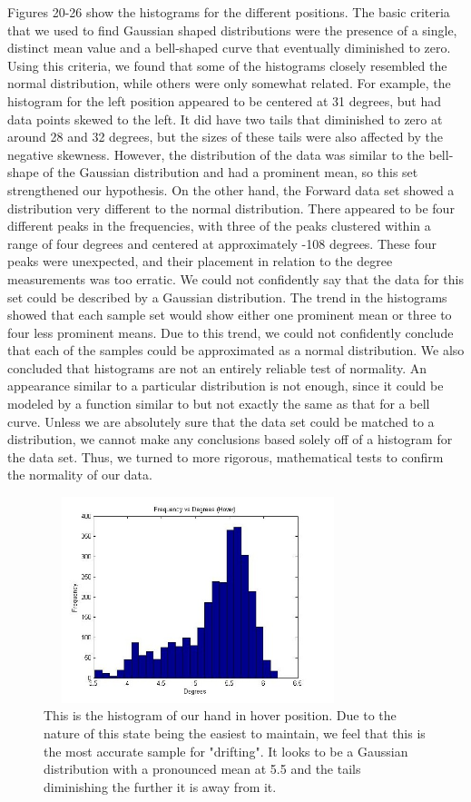\documentclass[letterpaper,english, 12pt]{article}
\begin{document}
Figures 20-26 show the histograms for the different positions. The basic criteria that we used to find Gaussian shaped distributions were the presence of a single, distinct mean value and a bell-shaped curve that eventually diminished to zero. Using this criteria, we found that some of the histograms closely resembled the normal distribution, while others were only somewhat related. For example, the histogram for the left position appeared to be centered at 31 degrees, but had data points skewed to the left. It did have two tails that diminished to zero at around 28 and 32 degrees, but the sizes of these tails were also affected by the negative skewness.  However, the distribution of the data was similar to the bell-shape of the Gaussian distribution and had a prominent mean, so this set strengthened our hypothesis. On the other hand, the Forward data set showed a distribution very different to the normal distribution. There appeared to be four different peaks in the frequencies, with three of the peaks clustered within a range of four degrees and centered at approximately -108 degrees. These four peaks were unexpected, and their placement in relation to the degree measurements was too erratic. We could not confidently say that the data for this set could be described by a Gaussian distribution. The trend in the histograms showed that each sample set would show either one prominent mean or three to four less prominent means. Due to this trend, we could not confidently conclude that each of the samples could be approximated as a normal distribution. We also concluded that histograms are not an entirely reliable test of normality. An appearance similar to a particular distribution is not enough, since it could be modeled by a function similar to but not exactly the same as that for a bell curve. Unless we are absolutely sure that the data set could be matched to a distribution, we cannot make any conclusions based solely off of a histogram for the data set. Thus, we turned to more rigorous, mathematical tests to confirm the normality of our data.

\begin{figure}[H]
	\centering
	\includegraphics[height=6cm,width=90mm]{pics/hoverHistogram1.jpg}
	\caption{This is the histogram of our hand in hover position. Due to the nature of this state being the easiest to maintain, we feel that this is the most accurate sample for "drifting". It looks to be a Gaussian distribution with a pronounced mean at 5.5 and the tails diminishing the further it is away from it.}
	\centering
\end{figure}
\end{document}
